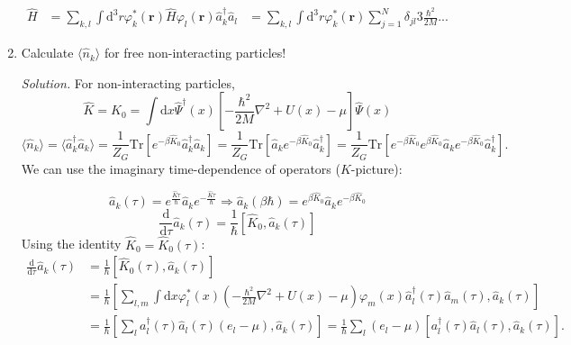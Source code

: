 \documentclass[11pt, a4paper]{article}
\newcommand{\dd}{\mathrm{d}}
\newcommand{\Tr}[1]{\mathrm{Tr}\left[#1\right]}
\begin{document}
\begin{enumerate}
\begin{align*}
        \hat H &= \sum\limits_{k,l}\int \dd^3 r \varphi^*_k(\mathbf r)\hat H\varphi_l(\mathbf r)\hat a_k^{\dagger}\hat a_l
        & = \sum\limits_{k,l}\int \dd^3 r \varphi^*_k(\mathbf r) \sum_{j=1}^N \delta_{jl} 3\frac{\hbar^2}{2M}...
    \end{align*}
    \item Calculate $\langle \hat n_k \rangle$ for free non-interacting particles!
    \par \textit{Solution.}
    For non-interacting particles,
    \begin{equation*}
        \hat K = \hat K_0 = \int\dd x \hat\Psi^{\dagger}(x)\left[ -\frac{\hbar^2}{2M}\nabla^2 + U(x) - \mu \right]\hat\Psi(x)
    \end{equation*}
    \begin{equation*}
        \langle \hat n_k \rangle = \langle \hat a_k^{\dagger}\hat a_k \rangle
        = \frac{1}{Z_G}\Tr{e^{-\beta \hat K_0}\hat a_k^{\dagger}\hat a_k} 
        = \frac{1}{Z_G}\Tr{\hat a_ke^{-\beta \hat K_0}\hat a_k^{\dagger}}
        = \frac{1}{Z_G}\Tr{e^{-\beta \hat K_0}e^{\beta \hat K_0}\hat a_ke^{-\beta \hat K_0}\hat a_k^{\dagger}}.
    \end{equation*}
    We can use the imaginary time-dependence of operators ($K$-picture):
    

    \begin{equation*}
        \hat a_k(\tau) = e^{\frac{\hat K\tau}{\hbar}}\hat a_k e^{-\frac{\hat K\tau}{\hbar}}
        \Longrightarrow
        \hat a_k(\beta\hbar) = e^{\beta \hat K_0}\hat a_ke^{-\beta \hat K_0}
    \end{equation*}
    \begin{equation*}
        \frac{\dd}{\dd\tau}\hat a_k(\tau) = \frac{1}{\hbar}[\hat K_0, \hat a_k(\tau)]
    \end{equation*}
    Using the identity $\hat K_0 = \hat K_0(\tau)$:
    \begin{align*}
        \frac{\dd}{\dd\tau}\hat a_k(\tau) &= \frac{1}{\hbar}[\hat K_0(\tau), \hat a_k(\tau)]\\
        & = \frac{1}{\hbar}\left[\sum\limits_{l,m}\int\dd x \varphi^*_l(x) \left(-\frac{\hbar^2}{2M}\nabla^2 + U(x) - \mu\right)
        \varphi_m(x)\hat a_l^{\dagger}(\tau)\hat a_m(\tau), \hat a_k(\tau) \right] \\
        & = \frac{1}{\hbar}\left[\sum\limits_{l}a_l^{\dagger}(\tau)\hat a_l(\tau) (e_l - \mu), \hat a_k(\tau)\right]
        = \frac{1}{\hbar}\sum\limits_{l}(e_l - \mu) \left[a_l^{\dagger}(\tau)\hat a_l(\tau), \hat a_k(\tau)\right].
    \end{align*}
    

\end{enumerate}
\end{document}
